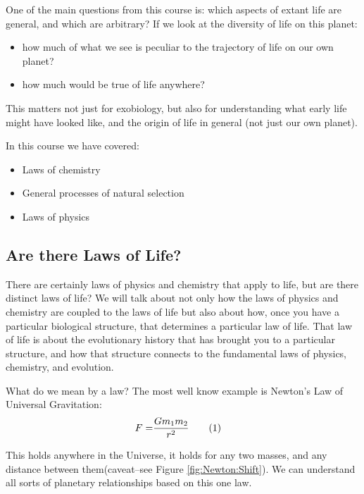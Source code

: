 \documentclass[]{article}
\newcommand\numberthis{\addtocounter{equation}{1}\tag{\theequation}}
\begin{document}
One of the main questions from this course is: which aspects of extant life are general, and which are arbitrary? If we look at the diversity of life on this planet:
\begin{itemize}
	\item how much of what we see is peculiar to the trajectory of life on our own planet?
	\item how much would be true of life anywhere?
\end{itemize}

This matters not just for exobiology, but also for understanding what early life might have looked like, and the origin of life in general (not just our own planet).

In this course we have covered:
\begin{itemize}
	\item Laws of chemistry
	\item General processes of natural selection
	\item Laws of physics
\end{itemize}

\subsection{Are there Laws of Life?} 

There are certainly laws of physics and chemistry that apply to life, but are there distinct laws of life? We will talk about not only how the laws of physics and chemistry are coupled to the laws of life but also about how, once you have a particular biological structure, that determines a particular law of life. That law of life is about the evolutionary history that has brought you to a particular structure, and how that structure connects to the fundamental laws of physics, chemistry, and evolution.

What do we mean by a law? The most well know example is Newton's Law of Universal Gravitation:
\begin{align*}
	F =& \frac{G m_1 m_2}{r^2} \numberthis \label{eq:newton}
\end{align*}

This holds anywhere in the Universe, it holds for any two masses, and any distance between them(caveat--see Figure \ref{fig:Newton:Shift}). We can understand all sorts of planetary relationships based on this one law.
\end{document}
